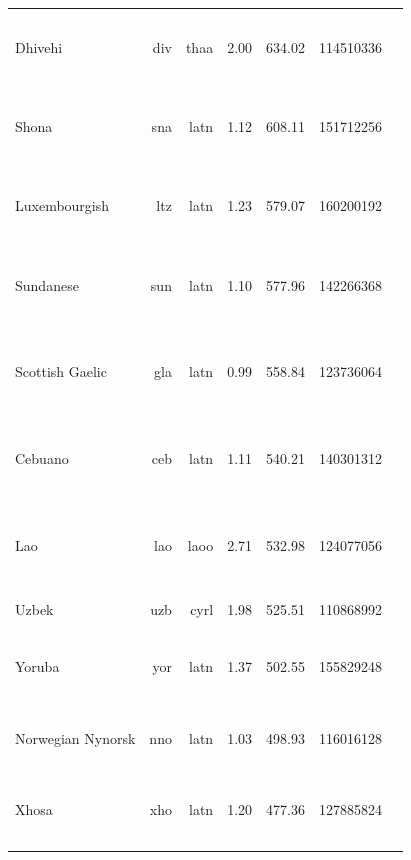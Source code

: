 \documentclass[11pt]{article}
\begin{document}
\begin{center}
\begin{longtable}[width=0.9\textwidth]{|lrrrrrl|}
Dhivehi & div & thaa & 2.00 & 634.02 & 114510336 & {\color{oscar}\rule{0.23cm}{8pt}}{\color{madlad400}\rule{2.33cm}{8pt}}{\color{glot500}\rule{1.41cm}{8pt}}{\color{other}\rule{0.03000000000000025cm}{8pt}} \\ 
Shona & sna & latn & 1.12 & 608.11 & 151712256 & {\color{nllb}\rule{1.12cm}{8pt}}{\color{madlad400}\rule{0.97cm}{8pt}}{\color{glot500}\rule{1.83cm}{8pt}}{\color{other}\rule{0.08000000000000007cm}{8pt}} \\ 
Luxembourgish & ltz & latn & 1.23 & 579.07 & 160200192 & {\color{oscar}\rule{0.15cm}{8pt}}{\color{nllb}\rule{1.11cm}{8pt}}{\color{madlad400}\rule{2.45cm}{8pt}}{\color{other}\rule{0.29000000000000004cm}{8pt}} \\ 
Sundanese & sun & latn & 1.10 & 577.96 & 142266368 & {\color{oscar}\rule{0.0cm}{8pt}}{\color{nllb}\rule{1.28cm}{8pt}}{\color{madlad400}\rule{1.04cm}{8pt}}{\color{glot500}\rule{1.54cm}{8pt}}{\color{other}\rule{0.13999999999999968cm}{8pt}} \\ 
Scottish Gaelic & gla & latn & 0.99 & 558.84 & 123736064 & {\color{oscar}\rule{0.01cm}{8pt}}{\color{nllb}\rule{0.85cm}{8pt}}{\color{madlad400}\rule{2.98cm}{8pt}}{\color{glot500}\rule{0.15cm}{8pt}}{\color{other}\rule{0.010000000000000231cm}{8pt}} \\ 
Cebuano & ceb & latn & 1.11 & 540.21 & 140301312 & {\color{oscar}\rule{0.18cm}{8pt}}{\color{nllb}\rule{1.01cm}{8pt}}{\color{madlad400}\rule{1.33cm}{8pt}}{\color{other}\rule{1.48cm}{8pt}} \\ 
Lao & lao & laoo & 2.71 & 532.98 & 124077056 & {\color{oscar}\rule{0.24cm}{8pt}}{\color{nllb}\rule{0.95cm}{8pt}}{\color{madlad400}\rule{2.73cm}{8pt}}{\color{glot500}\rule{0.07cm}{8pt}}{\color{other}\rule{0.010000000000000231cm}{8pt}} \\ 
Uzbek & uzb & cyrl & 1.98 & 525.51 & 110868992 & {\color{glot500}\rule{4.0cm}{8pt}} \\ 
Yoruba & yor & latn & 1.37 & 502.55 & 155829248 & {\color{oscar}\rule{0.0cm}{8pt}}{\color{nllb}\rule{1.85cm}{8pt}}{\color{madlad400}\rule{1.04cm}{8pt}}{\color{glot500}\rule{0.94cm}{8pt}}{\color{other}\rule{0.16999999999999993cm}{8pt}} \\ 
Norwegian Nynorsk & nno & latn & 1.03 & 498.93 & 116016128 & {\color{oscar}\rule{0.3cm}{8pt}}{\color{glot500}\rule{2.84cm}{8pt}}{\color{other}\rule{0.8600000000000003cm}{8pt}} \\ 
Xhosa & xho & latn & 1.20 & 477.36 & 127885824 & {\color{nllb}\rule{1.64cm}{8pt}}{\color{madlad400}\rule{1.32cm}{8pt}}{\color{glot500}\rule{1.02cm}{8pt}}{\color{other}\rule{0.020000000000000018cm}{8pt}} \\ 

\end{longtable}
\end{center}
\end{document}
